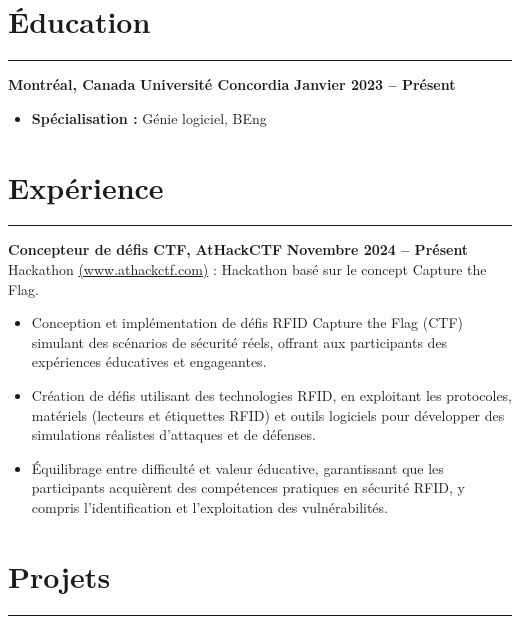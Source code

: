 \documentclass[10pt]{article}
\begin{document}
\vspace{-8mm}

\section*{Éducation}
\vspace{-2mm}
\hrule
\vspace{0mm}

\textbf{Montréal, Canada} \hfill \textbf{Université Concordia} \hfill \textbf{Janvier 2023 -- Présent} 
\vspace{-4mm}
\begin{itemize}[left=0.15in, itemsep=0pt]
    \item \textbf{Spécialisation :} Génie logiciel, BEng
\end{itemize}

\section*{Expérience}
\vspace{-2mm}
\hrule
\vspace{0mm}

\textbf{Concepteur de défis CTF, } \hfill \textbf{AtHackCTF} \hfill \textbf{Novembre 2024 -- Présent} \\
{Hackathon {\href{https://www.athackctf.com}{(www.athackctf.com)} : Hackathon basé sur le concept Capture the Flag.}}
\vspace{-4mm}
\begin{itemize}[left=0.15in, itemsep=0pt]
    \item Conception et implémentation de défis RFID Capture the Flag (CTF) simulant des scénarios de sécurité réels, offrant aux participants des expériences éducatives et engageantes.
    \item Création de défis utilisant des technologies RFID, en exploitant les protocoles, matériels (lecteurs et étiquettes RFID) et outils logiciels pour développer des simulations réalistes d'attaques et de défenses.
    \item Équilibrage entre difficulté et valeur éducative, garantissant que les participants acquièrent des compétences pratiques en sécurité RFID, y compris l'identification et l'exploitation des vulnérabilités.
\end{itemize}

\section*{Projets}
\vspace{-2mm}
\hrule
\vspace{0mm}
\end{document}
